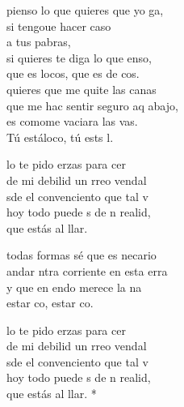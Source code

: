 \documentclass[12pt]{article}
\begin{document}
\begin{multicols*}{2}
\begin{cancion}%
	 pienso lo que quieres que yo ga,\\
	si tengoue hacer caso \\
	a tus pabras,\\
	si quieres te diga lo que enso,\\
	que es  locos, que es de cos.\\
	 quieres que me quite las canas\\
	que me hac sentir seguro aq abajo, \\
	es comome vaciara las vas.\\
	Tú estáloco, tú ests l.\\
	\begin{chorus}%
	lo te pido erzas para cer \\
	de mi debilid un rreo vendal\\
	sde el convenciento que tal v\\
	hoy todo puede s de n realid,\\
	que  estás al llar.  \\
	\end{chorus}%
	 todas formas sé que es necario\\
	andar ntra corriente en esta erra\\
	y que en endo merece la na\\
	estar co, estar co.\\
	\begin{chorus}%
	lo te pido erzas para cer \\
	de mi debilid un rreo vendal\\
	sde el convenciento que tal v\\
	hoy todo puede s de n realid,\\
	que  estás al llar. *\\
	\end{chorus}%
\end{cancion}%


\end{multicols*}
\end{document}

